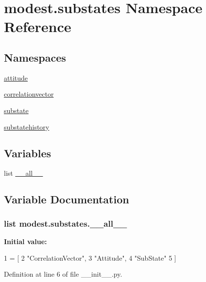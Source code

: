 \hypertarget{namespacemodest_1_1substates}{}\section{modest.\+substates Namespace Reference}
\label{namespacemodest_1_1substates}
\subsection*{Namespaces}
\begin{DoxyCompactItemize}
\item 
 \hyperlink{namespacemodest_1_1substates_1_1attitude}{attitude}
\item 
 \hyperlink{namespacemodest_1_1substates_1_1correlationvector}{correlationvector}
\item 
 \hyperlink{namespacemodest_1_1substates_1_1substate}{substate}
\item 
 \hyperlink{namespacemodest_1_1substates_1_1substatehistory}{substatehistory}
\end{DoxyCompactItemize}
\subsection*{Variables}
\begin{DoxyCompactItemize}
\item 
list \hyperlink{namespacemodest_1_1substates_a63be689023d94e7614e63706168d6e5e}{\+\_\+\+\_\+all\+\_\+\+\_\+}
\end{DoxyCompactItemize}


\subsection{Variable Documentation}
\subsubsection[{\texorpdfstring{\+\_\+\+\_\+all\+\_\+\+\_\+}{__all__}}]{\setlength{\rightskip}{0pt plus 5cm}list modest.\+substates.\+\_\+\+\_\+all\+\_\+\+\_\+\hspace{0.3cm}{\ttfamily [private]}}\hypertarget{namespacemodest_1_1substates_a63be689023d94e7614e63706168d6e5e}{}\label{namespacemodest_1_1substates_a63be689023d94e7614e63706168d6e5e}
{\bfseries Initial value\+:}
\begin{DoxyCode}
1 = [
2     \textcolor{stringliteral}{"CorrelationVector"},
3     \textcolor{stringliteral}{"Attitude"},
4     \textcolor{stringliteral}{"SubState"}
5 ]
\end{DoxyCode}


Definition at line 6 of file \+\_\+\+\_\+init\+\_\+\+\_\+.\+py.

